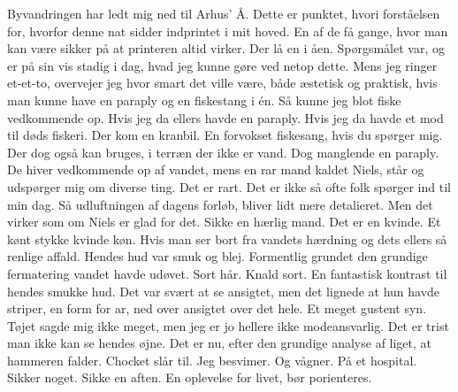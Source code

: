 \documentclass[]{article}
\begin{document}
	\newline
	Byvandringen har ledt mig ned til Arhus’ Å. Dette er punktet, hvori forståelsen
	for, hvorfor denne nat sidder indprintet i mit hoved. En af de få gange, hvor
	man kan være sikker på at printeren altid virker. Der lå en i åen. Spørgsmålet
	var, og er på sin vis stadig i dag, hvad jeg kunne gøre ved netop dette. Mens
	jeg ringer et-et-to, overvejer jeg hvor smart det ville være, både æstetisk og
	praktisk, hvis man kunne have en paraply og en fiskestang i én. Så kunne jeg
	blot fiske vedkommende op. Hvis jeg da ellers havde en paraply. Hvis jeg da
	havde et mod til døds fiskeri.
	\newline
	\newline
	Der kom en kranbil. En forvokset fiskesang, hvis du spørger mig. Der dog også
	kan bruges, i terræn der ikke er vand. Dog manglende en paraply. De hiver
	vedkommende op af vandet, mens en rar mand kaldet Niels, står og udspørger mig om diverse ting. Det er rart. Det er ikke så ofte folk spørger ind til min dag.
	Så udluftningen af dagens forløb, bliver lidt mere detalieret. Men det virker som
	om Niels er glad for det. Sikke en hærlig mand.
	\newline
	\newline
	Det er en kvinde. Et kønt stykke kvinde køn. Hvis man ser bort fra vandets hærdning og dets ellers så renlige affald. Hendes hud var smuk og blej.
	Formentlig grundet den grundige fermatering vandet havde udøvet. Sort hår.
	Knald sort. En fantastisk kontrast til hendes smukke hud. Det var svært at se
	ansigtet, men det lignede at hun havde striper, en form for ar, ned over ansigtet
	over det hele. Et meget gustent syn. Tøjet sagde mig ikke meget, men jeg er jo
	hellere ikke modeansvarlig. Det er trist man ikke kan se hendes øjne.
	\newline
	\newline
	Det er nu, efter den grundige analyse af liget, at hammeren falder. Chocket
	slår til. Jeg besvimer. Og vågner. På et hospital. Sikker noget. Sikke en aften.
	En oplevelse for livet, bør porienteres.
	
	
\end{document}
